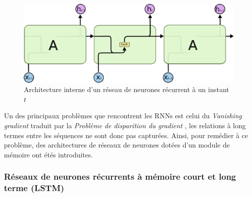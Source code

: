 		\begin{figure}[H]
			\centering
			
			\includegraphics[width=0.5\linewidth]{images/notions/rnns_unrolled_online.png}
			\caption{Architecture interne d'un réseau de neurones récurrent à un instant $t$ \cite{rnns_online}}
		\end{figure}
		\par 
		Un des principaux problèmes que rencontrent les RNNs est celui du \textit{Vanishing gradient} traduit par la \textit{Problème de disparition du gradient} \cite{vanishing_gradient}, les relations à long termes entre les séquences ne sont donc pas capturées. Ainsi, pour remédier à ce problème, des architectures de réseaux de neurones dotées d'un module de mémoire ont étés introduites.
		
		\subsubsection{Réseaux de neurones récurrents à mémoire court et long terme (LSTM)}
